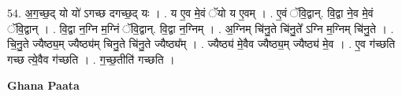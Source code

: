 \documentclass[17pt]{extarticle}
\begin{document}
54. अ॒ग॒च्छ॒द् यो यो॑ ऽगच्छ दगच्छ॒द् यः । . य ए॒व मे॒वं ॅयो य ए॒वम् । . ए॒वं ॅवि॒द्वान्. वि॒द्वा ने॒व मे॒वं ॅवि॒द्वान् । . वि॒द्वा न॒ग्नि म॒ग्निं ॅवि॒द्वान्. वि॒द्वा न॒ग्निम् । . अ॒ग्निम् चि॑नु॒ते चि॑नु॒ते᳚ ऽग्नि म॒ग्निम् चि॑नु॒ते । . चि॒नु॒ते ज्यैष्ठ्य॒म् ज्यैष्ठ्य॑म् चिनु॒ते चि॑नु॒ते ज्यैष्ठ्य᳚म् । . ज्यैष्ठ्य॑ मे॒वैव ज्यैष्ठ्य॒म् ज्यैष्ठ्य॑ मे॒व । . ए॒व ग॑च्छति गच्छ त्ये॒वैव ग॑च्छति । . ग॒च्छ॒तीति॑ गच्छति । \newline

\textbf{Ghana Paata } \newline
\end{document}
